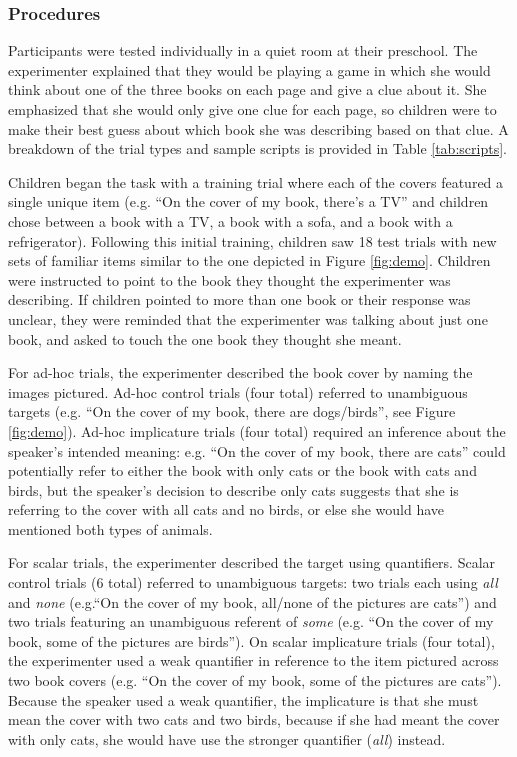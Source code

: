 \documentclass[10pt,letterpaper]{article}
\begin{document}
\subsubsection{Procedures}

Participants were tested individually in a quiet room at their preschool.  The experimenter explained that they would be playing a game in which she would think about one of the three books on each page and give a clue about it. She emphasized that she would only give one clue for each page, so children were to make their best guess about which book she was describing based on that clue. A breakdown of the trial types and sample scripts is provided in Table \ref{tab:scripts}.

Children began the task with a training trial where each of the covers featured a single unique item (e.g. ``On the cover of my book, there's a TV'' and children chose between a book with a TV, a book with a sofa, and a book with a refrigerator).  Following this initial training, children saw 18 test trials with new sets of familiar items similar to the one depicted in Figure \ref{fig:demo}.  Children were instructed to point to the book they thought the experimenter was describing. If children pointed to more than one book or their response was unclear, they were reminded that the experimenter was talking about just one book, and asked to touch the one book they thought she meant.  

For ad-hoc trials, the experimenter described the book cover by naming the images pictured. Ad-hoc control trials (four total) referred to unambiguous targets (e.g. ``On the cover of my book, there are dogs/birds'', see Figure \ref{fig:demo}).  Ad-hoc implicature trials (four total) required an inference about the speaker's intended meaning: e.g. ``On the cover of my book, there are cats'' could potentially refer to either the book with only cats or the book with cats and birds, but the speaker's decision to describe only cats suggests that she is referring to the cover with all cats and no birds, or else she would have mentioned both types of animals. 

For scalar trials, the experimenter described the target using quantifiers. Scalar control trials (6 total) referred to unambiguous targets: two trials each using \emph{all} and \emph{none} (e.g.``On the cover of my book, all/none of the pictures are cats'') and two trials featuring an unambiguous referent of \emph{some} (e.g. ``On the cover of my book, some of the pictures are birds'').  On scalar implicature trials (four total), the experimenter used a weak quantifier in reference to the item pictured across two book covers (e.g. ``On the cover of my book, some of the pictures are cats''). Because the speaker used a weak quantifier, the implicature is that she must mean the cover with two cats and two birds, because if she had meant the cover with only cats, she would have use the stronger quantifier (\emph{all}) instead. 
\end{document}
